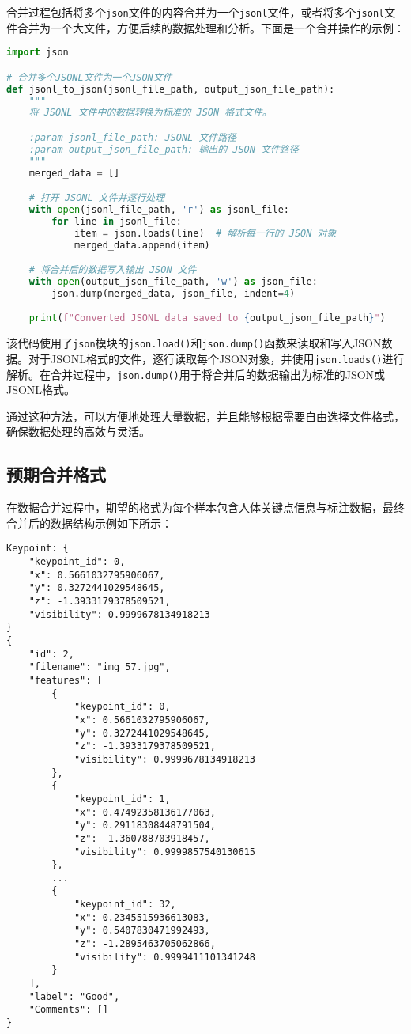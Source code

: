 合并过程包括将多个\texttt{json}文件的内容合并为一个\texttt{jsonl}文件，或者将多个\texttt{jsonl}文件合并为一个大文件，方便后续的数据处理和分析。下面是一个合并操作的示例：

\begin{lstlisting}[language=Python]
import json

# 合并多个JSONL文件为一个JSON文件
def jsonl_to_json(jsonl_file_path, output_json_file_path):
    """
    将 JSONL 文件中的数据转换为标准的 JSON 格式文件。

    :param jsonl_file_path: JSONL 文件路径
    :param output_json_file_path: 输出的 JSON 文件路径
    """
    merged_data = []

    # 打开 JSONL 文件并逐行处理
    with open(jsonl_file_path, 'r') as jsonl_file:
        for line in jsonl_file:
            item = json.loads(line)  # 解析每一行的 JSON 对象
            merged_data.append(item)

    # 将合并后的数据写入输出 JSON 文件
    with open(output_json_file_path, 'w') as json_file:
        json.dump(merged_data, json_file, indent=4)

    print(f"Converted JSONL data saved to {output_json_file_path}")
\end{lstlisting}

\noindent 该代码使用了\texttt{json}模块的\texttt{json.load()}和\texttt{json.dump()}函数来读取和写入JSON数据。对于JSONL格式的文件，逐行读取每个JSON对象，并使用\texttt{json.loads()}进行解析。在合并过程中，\texttt{json.dump()}用于将合并后的数据输出为标准的JSON或JSONL格式。

通过这种方法，可以方便地处理大量数据，并且能够根据需要自由选择文件格式，确保数据处理的高效与灵活。

\subsection{预期合并格式}

在数据合并过程中，期望的格式为每个样本包含人体关键点信息与标注数据，最终合并后的数据结构示例如下所示：

\begin{lstlisting}
Keypoint: {
    "keypoint_id": 0,
    "x": 0.5661032795906067,
    "y": 0.3272441029548645,
    "z": -1.3933179378509521,
    "visibility": 0.9999678134918213
}
{
    "id": 2,
    "filename": "img_57.jpg",
    "features": [
        {
            "keypoint_id": 0,
            "x": 0.5661032795906067,
            "y": 0.3272441029548645,
            "z": -1.3933179378509521,
            "visibility": 0.9999678134918213
        },
        {
            "keypoint_id": 1,
            "x": 0.47492358136177063,
            "y": 0.29118308448791504,
            "z": -1.360788703918457,
            "visibility": 0.9999857540130615
        },
        ...
        {
            "keypoint_id": 32,
            "x": 0.2345515936613083,
            "y": 0.5407830471992493,
            "z": -1.2895463705062866,
            "visibility": 0.9999411101341248
        }
    ],
    "label": "Good",
    "Comments": []
}
\end{lstlisting}

